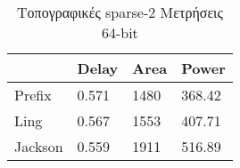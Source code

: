 \begin{multicols}{2}
\begin{table}[H]
\caption{Τοπογραφικές sparse-2 Μετρήσεις 32-bit}
\label{topo_sparse2_result_table_32}
\end{table}
\begin{table}[H]
\centering
     \begin{tabular}{||p{1.2cm} | p{0.7cm} p{1cm} p{1cm} ||} 
        \hline
         & Delay & Area & Power \\ [0.5ex] 
        \hline\hline
        Prefix & 0.571 & 1480 & 368.42 \\
        \hline
        Ling & 0.567 & 1553 & 407.71 \\
        \hline
        Jackson & 0.559 & 1911 & 516.89 \\
        \hline
    \end{tabular}
\caption{Τοπογραφικές sparse-2 Μετρήσεις 64-bit}
\label{topo_sparse2_result_table_64}
\end{table}
\end{multicols}








